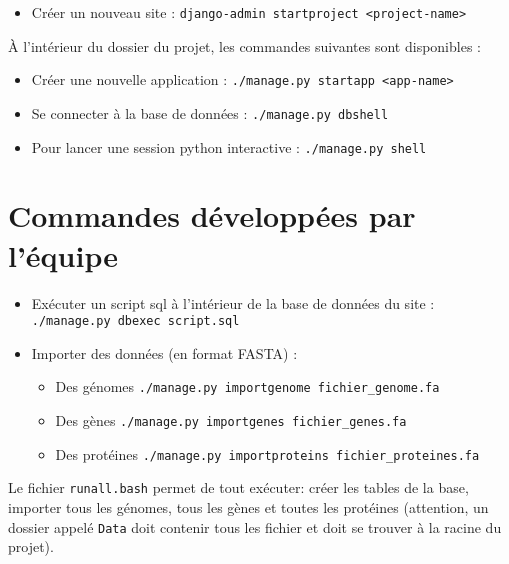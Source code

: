 \documentclass[
  openany]{book}
\providecommand{\tightlist}{%
  \setlength{\itemsep}{0pt}\setlength{\parskip}{0pt}}
\begin{document}
\begin{itemize}
\tightlist
\item
  Créer un nouveau site : \texttt{django-admin\ startproject\ \textless{}project-name\textgreater{}}
\end{itemize}

À l'intérieur du dossier du projet, les commandes suivantes sont disponibles :

\begin{itemize}
\tightlist
\item
  Créer une nouvelle application : \texttt{./manage.py\ startapp\ \textless{}app-name\textgreater{}}
\item
  Se connecter à la base de données : \texttt{./manage.py\ dbshell}
\item
  Pour lancer une session python interactive : \texttt{./manage.py\ shell}
\end{itemize}

\hypertarget{commandsbis}{%
\section*{Commandes développées par l'équipe}\label{commandsbis}}

\begin{itemize}
\tightlist
\item
  Exécuter un script sql à l'intérieur de la base de données du site :
  \texttt{./manage.py\ dbexec\ script.sql}
\item
  Importer des données (en format FASTA) :

  \begin{itemize}
  \tightlist
  \item
    Des génomes \texttt{./manage.py\ importgenome\ fichier\_genome.fa}
  \item
    Des gènes \texttt{./manage.py\ importgenes\ fichier\_genes.fa}
  \item
    Des protéines \texttt{./manage.py\ importproteins\ fichier\_proteines.fa}
  \end{itemize}
\end{itemize}

Le fichier \texttt{runall.bash} permet de tout exécuter: créer les tables de la base,
importer tous les génomes, tous les gènes et toutes les protéines (attention,
un dossier appelé \texttt{Data} doit contenir tous les fichier et doit se trouver
à la racine du projet).

  
\end{document}
